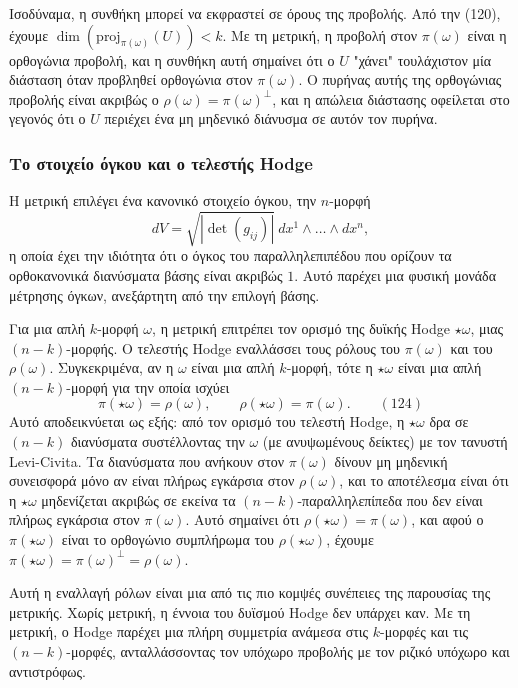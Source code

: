 \documentclass[12pt]{article}
\begin{document}
Ισοδύναμα, η συνθήκη μπορεί να εκφραστεί σε όρους της προβολής. Από την (120), έχουμε $\dim(\text{proj}_{\pi(\omega)}(U)) < k$. Με τη μετρική, η προβολή στον $\pi(\omega)$ είναι η ορθογώνια προβολή, και η συνθήκη αυτή σημαίνει ότι ο $U$ "χάνει" τουλάχιστον μία διάσταση όταν προβληθεί ορθογώνια στον $\pi(\omega)$. Ο πυρήνας αυτής της ορθογώνιας προβολής είναι ακριβώς ο $\rho(\omega) = \pi(\omega)^\perp$, και η απώλεια διάστασης οφείλεται στο γεγονός ότι ο $U$ περιέχει ένα μη μηδενικό διάνυσμα σε αυτόν τον πυρήνα.

\subsubsection{Το στοιχείο όγκου και ο τελεστής Hodge}

Η μετρική επιλέγει ένα κανονικό στοιχείο όγκου, την $n$-μορφή
\[
dV = \sqrt{|\det(g_{ij})|} \ dx^1 \wedge \dots \wedge dx^n,
\]
η οποία έχει την ιδιότητα ότι ο όγκος του παραλληλεπιπέδου που ορίζουν τα ορθοκανονικά διανύσματα βάσης είναι ακριβώς $1$. Αυτό παρέχει μια φυσική μονάδα μέτρησης όγκων, ανεξάρτητη από την επιλογή βάσης.

Για μια απλή $k$-μορφή $\omega$, η μετρική επιτρέπει τον ορισμό της δυϊκής Hodge $\star \omega$, μιας $(n-k)$-μορφής. Ο τελεστής Hodge εναλλάσσει τους ρόλους του $\pi(\omega)$ και του $\rho(\omega)$. Συγκεκριμένα, αν η $\omega$ είναι μια απλή $k$-μορφή, τότε η $\star \omega$ είναι μια απλή $(n-k)$-μορφή για την οποία ισχύει
\begin{equation}
\pi(\star \omega) = \rho(\omega), \qquad \rho(\star \omega) = \pi(\omega). \qquad (124)
\end{equation}
Αυτό αποδεικνύεται ως εξής: από τον ορισμό του τελεστή Hodge, η $\star \omega$ δρα σε $(n-k)$ διανύσματα συστέλλοντας την $\omega$ (με ανυψωμένους δείκτες) με τον τανυστή Levi-Civita. Τα διανύσματα που ανήκουν στον $\pi(\omega)$ δίνουν μη μηδενική συνεισφορά μόνο αν είναι πλήρως εγκάρσια στον $\rho(\omega)$, και το αποτέλεσμα είναι ότι η $\star \omega$ μηδενίζεται ακριβώς σε εκείνα τα $(n-k)$-παραλληλεπίπεδα που δεν είναι πλήρως εγκάρσια στον $\pi(\omega)$. Αυτό σημαίνει ότι $\rho(\star \omega) = \pi(\omega)$, και αφού ο $\pi(\star \omega)$ είναι το ορθογώνιο συμπλήρωμα του $\rho(\star \omega)$, έχουμε $\pi(\star \omega) = \pi(\omega)^\perp = \rho(\omega)$.

Αυτή η εναλλαγή ρόλων είναι μια από τις πιο κομψές συνέπειες της παρουσίας της μετρικής. Χωρίς μετρική, η έννοια του δυϊσμού Hodge δεν υπάρχει καν. Με τη μετρική, ο Hodge παρέχει μια πλήρη συμμετρία ανάμεσα στις $k$-μορφές και τις $(n-k)$-μορφές, ανταλλάσσοντας τον υπόχωρο προβολής με τον ριζικό υπόχωρο και αντιστρόφως.
\end{document}
